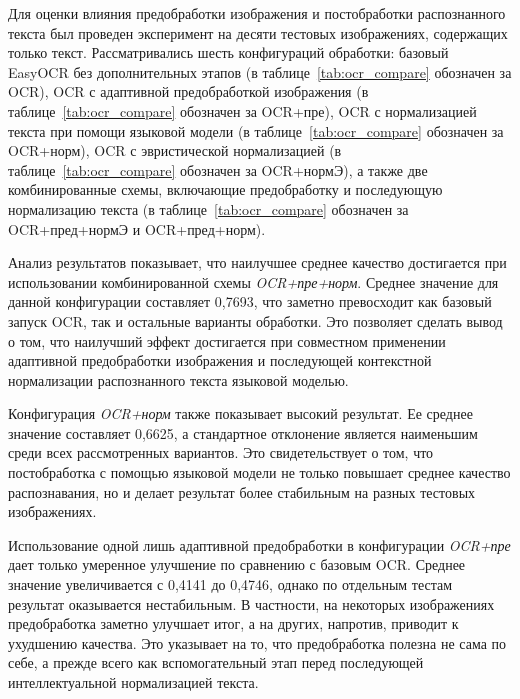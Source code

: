 Для оценки влияния предобработки изображения и постобработки распознанного текста был проведен эксперимент на десяти тестовых изображениях, содержащих только текст. Рассматривались шесть конфигураций обработки: базовый EasyOCR без дополнительных этапов (в таблице~\ref{tab:ocr_compare} обозначен за OCR), OCR с адаптивной предобработкой изображения (в таблице~\ref{tab:ocr_compare} обозначен за OCR+пре), OCR с нормализацией текста при помощи языковой модели (в таблице~\ref{tab:ocr_compare} обозначен за OCR+норм), OCR с эвристической нормализацией (в таблице~\ref{tab:ocr_compare} обозначен за OCR+нормЭ), а также две комбинированные схемы, включающие предобработку и последующую нормализацию текста (в таблице~\ref{tab:ocr_compare} обозначен за OCR+пред+нормЭ и OCR+пред+норм).

\begin{table}[t]
	\centering
	\small
	\setlength{\tabcolsep}{4pt}
	\renewcommand{\arraystretch}{1.15}
	\resizebox{\textwidth}{!}{
		
	}
	\caption{Сравнение качества распознавания текста при различных конфигурациях OCR}
	\label{tab:ocr_compare}
\end{table}

Анализ результатов показывает, что наилучшее среднее качество достигается при использовании комбинированной схемы \textit{OCR+пре+норм}. Среднее значение для данной конфигурации составляет 0,7693, что заметно превосходит как базовый запуск OCR, так и остальные варианты обработки. Это позволяет сделать вывод о том, что наилучший эффект достигается при совместном применении адаптивной предобработки изображения и последующей контекстной нормализации распознанного текста языковой моделью.

Конфигурация \textit{OCR+норм} также показывает высокий результат. Ее среднее значение составляет 0,6625, а стандартное отклонение является наименьшим среди всех рассмотренных вариантов. Это свидетельствует о том, что постобработка с помощью языковой модели не только повышает среднее качество распознавания, но и делает результат более стабильным на разных тестовых изображениях.

Использование одной лишь адаптивной предобработки в конфигурации \textit{OCR+пре} дает только умеренное улучшение по сравнению с базовым OCR. Среднее значение увеличивается с 0,4141 до 0,4746, однако по отдельным тестам результат оказывается нестабильным. В частности, на некоторых изображениях предобработка заметно улучшает итог, а на других, напротив, приводит к ухудшению качества. Это указывает на то, что предобработка полезна не сама по себе, а прежде всего как вспомогательный этап перед последующей интеллектуальной нормализацией текста.

